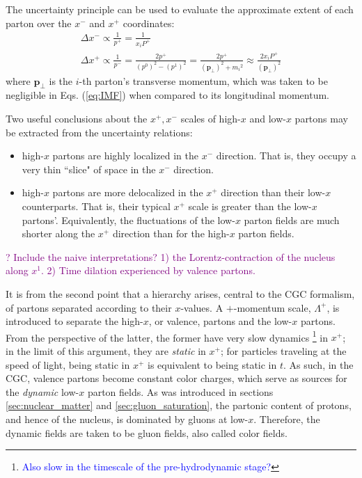 The uncertainty principle can be used to evaluate the approximate extent of each parton over the $x^-$ and $x^+$ coordinates: \cite{Lappi_notes,Albacete:2014fwa}
\begin{subequations} \label{eq:Uncertainty_Relations}
	\begin{gather}
		\Delta x^- \propto \frac{1}{p^+} = \frac{1}{x_i P^+} \\
		\Delta x^+ \propto \frac{1}{p^-} = \frac{2p^+}{(p^0)^2 - (p^1)^2} = \frac{2p^+}{(\mathbf{p}_\perp)^2 + {m_i}^2} \approx \frac{2 x_i P^+}{(\mathbf{p}_\perp)^2}
	\end{gather}
\end{subequations}
where $\mathbf{p}_\perp$ is the $i$-th parton's transverse momentum, which was taken to be negligible in Eqs. (\ref{eq:IMF}) when compared to its longitudinal momentum.

Two useful conclusions about the $x^+,x^-$  scales of high-$x$ and low-$x$ partons may be extracted from the uncertainty relations:
\begin{itemize}
	\item[1)] high-$x$ partons are highly localized in the $x^-$ direction. That is, they occupy a very thin ``slice" of space in the $x^-$ direction.
	\item[2)] high-$x$ partons are more delocalized in the $x^+$ direction than their low-$x$ counterparts. That is, their typical $x^+$ scale %
		is greater than the low-$x$ partons'. Equivalently, the fluctuations of the low-$x$ parton fields are much shorter along the $x^+$ direction than for the high-$x$ parton fields.
\end{itemize}

\textcolor{purple}{? Include the naive \cite{Lappi_notes} interpretations? 1) the Lorentz-contraction of the nucleus along $x^1$. 2) Time dilation experienced by valence partons.}

It is from the second point that a hierarchy arises, central to the \gls{CGC} formalism, of partons separated according to their $x$-values. A $+$-momentum scale, $\Lambda^+$, is introduced to separate the high-$x$, or valence, partons and the low-$x$ partons. From the perspective of the latter, the former have very slow dynamics\textcolor{red}{ \footnote{\textcolor{blue}{Also slow in the timescale of the pre-hydrodynamic stage?}}} in $x^+$; in the limit of this argument, they are \emph{static} in $x^+$; for particles traveling at the speed of light, being static in $x^+$ is equivalent to being static in $t$. As such, in the \gls{CGC}, valence partons become constant color charges, which serve as sources for the \emph{dynamic} low-$x$ parton fields.
As was introduced in sections \ref{sec:nuclear_matter} and \ref{sec:gluon_saturation}, the partonic content of protons, and hence of the nucleus, is dominated by gluons at low-$x$. Therefore, the dynamic fields are taken to be gluon fields, also called color fields.

